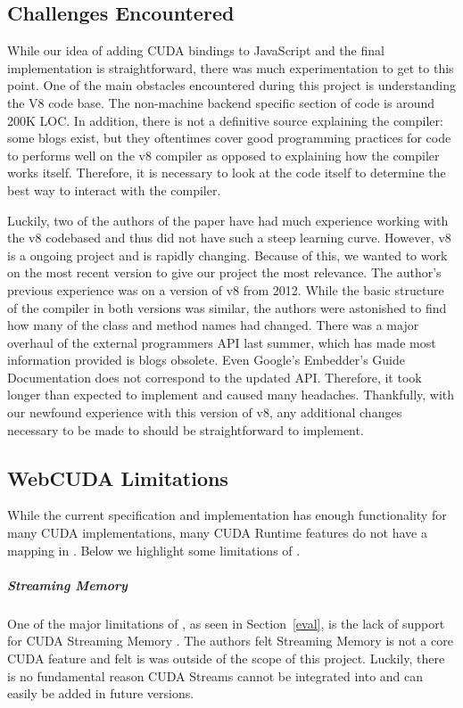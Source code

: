 
\subsection{Challenges Encountered}
While our idea of adding CUDA bindings to JavaScript and the final
implementation is straightforward, there was much experimentation to get to this point.
One of the main obstacles encountered during this project is understanding the
V8 code base. The non-machine backend specific section of code is around 200K
LOC. In addition, there is not a definitive source explaining the compiler: some
blogs exist, but they oftentimes cover good programming practices for code to
performs well on the v8 compiler as opposed to explaining how the compiler works
itself. Therefore, it is necessary to look at the code itself to determine the
best way to interact with the compiler.

Luckily, two of the authors of the paper have had much experience working with
the v8 codebased and thus did not have such a steep learning curve. However, v8
is a ongoing project and is rapidly changing. Because of this, we wanted to work
on the most recent version to give our project the most relevance. The author's
previous experience was on a version of v8 from 2012. While the basic structure
of the compiler in both versions was similar, the authors were astonished to
find how many of the class and method names had changed. There was a major
overhaul of the external programmers API last summer, which has made most
information provided is blogs obsolete. Even Google's Embedder's Guide
Documentation \cite{embeddersGuide} does not correspond to the updated API.
Therefore, it took longer than expected to implement \name and caused many
headaches. Thankfully, with our newfound experience with this version of v8, any
additional changes necessary to be made to \name should be straightforward to
implement.

\subsection{WebCUDA Limitations}
While the current \name specification and implementation has enough
functionality for many CUDA implementations, many CUDA Runtime features do not
have a mapping in \namens. Below we highlight some limitations of \namens.

\subparagraph{Streaming Memory}
 One of the major limitations of \namens, as seen in
Section~\ref{eval}, is the lack of support for CUDA Streaming Memory
\cite{cuStream}. The authors felt Streaming Memory is not a core
CUDA feature and felt is was outside of the scope of this project.
Luckily, there is no fundamental reason CUDA Streams cannot be integrated into 
\name and can easily be added in future versions.

